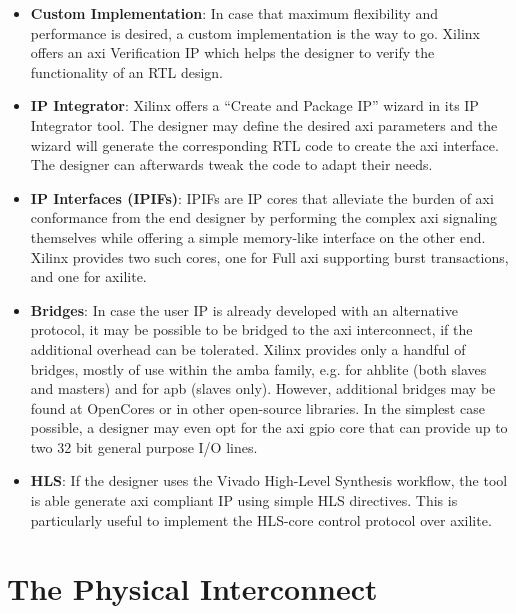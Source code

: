 \begin{itemize}
\item	\textbf{Custom Implementation}:
	In case that maximum flexibility and performance is desired,
	a custom implementation is the way to go. 
	Xilinx offers an \gls{axi} Verification IP 
	which helps the designer to verify the functionality of an RTL design.

\item	\textbf{IP Integrator}:
	Xilinx offers a ``Create and Package IP'' wizard in its IP Integrator tool.
	The designer may define the desired \gls{axi} parameters 
	and the wizard will generate the corresponding RTL code
	to create the \gls{axi} interface. 
	The designer can afterwards tweak the code to adapt their needs.

\item	\textbf{IP Interfaces (IPIFs)}:
	IPIFs are IP cores that alleviate the burden of \gls{axi} conformance 
	from the end designer by performing the complex \gls{axi} signaling 
	themselves while offering a simple memory-like interface on the other end. 
	Xilinx provides two such cores, one for Full \gls{axi} 
	supporting \gls{burst} transactions, and one for \gls{axilite}.

\item	\textbf{Bridges}: In case the user IP is already developed with an alternative protocol,
	it may be possible to be bridged to the \gls{axi} interconnect, 
	if the additional overhead can be tolerated.
	Xilinx provides only a handful of bridges, mostly of use within the \gls{amba} family, 
	e.g. for \gls{ahblite} (both slaves and masters) and for \gls{apb} (slaves only). 
	However, additional bridges may be found at OpenCores or in other open-source libraries. 
	In the simplest case possible, a designer may even opt for 
	the \gls{axi} \gls{gpio} core that can provide up to two 32 bit general purpose I/O lines.

\item	\textbf{HLS}: If the designer uses the Vivado High-Level Synthesis workflow,
	the tool is able generate \gls{axi} compliant IP using simple HLS directives. 
	This is particularly useful to implement the HLS-core control protocol over \gls{axilite}.
\end{itemize}

\section{The Physical Interconnect}
\label{sect:interconnect}

